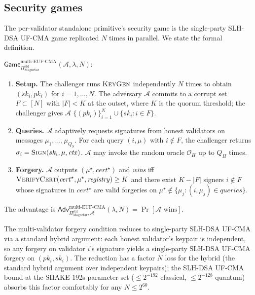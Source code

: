 \subsection{Security games}
\label{sec:prelim:games}

The per-validator standalone primitive's security game is the
single-party SLH-DSA UF-CMA game replicated $N$ times in parallel.
We state the formal definition.

\begin{definition}
\label{def:multivalidator-eufcma}
$\mathsf{Game}^{\mathrm{multi\text{-}EUF\text{-}CMA}}_{
\Pi^{\mathrm{std}}_{\mathrm{Magnetar}}}(\mathcal{A}, \lambda, N)$:
\begin{enumerate}[nosep,leftmargin=2em]
  \item \textbf{Setup.} The challenger runs $\textsc{KeyGen}$
        independently $N$ times to obtain $(sk_i, pk_i)$ for
        $i = 1, \ldots, N$. The adversary $\mathcal{A}$ commits
        to a corrupt set $F \subset [N]$ with $|F| < K$ at the
        outset, where $K$ is the quorum threshold; the
        challenger gives $\mathcal{A}$
        $\{(pk_i)\}_{i=1}^N \cup \{sk_i : i \in F\}$.
  \item \textbf{Queries.} $\mathcal{A}$ adaptively requests
        signatures from honest validators on messages $\mu_1,
        \ldots, \mu_{Q_S}$. For each query
        $(i, \mu)$ with $i \notin F$, the challenger returns
        $\sigma_i = \textsc{Sign}(sk_i, \mu, \mathit{ctx})$.
        $\mathcal{A}$ may invoke the random oracle $\mathcal{O}_H$
        up to $Q_H$ times.
  \item \textbf{Forgery.} $\mathcal{A}$ outputs $(\mu^\star,
        \mathit{cert}^\star)$ and \emph{wins} iff
        $\textsc{VerifyCert}(\mathit{cert}^\star, \mu^\star,
        \mathit{registry}) \ge K$ and there exist $K - |F|$
        signers $i \notin F$ whose signatures in $\mathit{cert}^\star$
        are valid forgeries on $\mu^\star \notin \{\mu_j : (i, \mu_j)
        \in \mathit{queries}\}$.
\end{enumerate}
The advantage is
$\mathsf{Adv}^{\mathrm{multi\text{-}EUF\text{-}CMA}}_{
\Pi^{\mathrm{std}}_{\mathrm{Magnetar}}, \mathcal{A}}(\lambda, N)
= \Pr[\mathcal{A} \text{ wins}]$.
\end{definition}

The multi-validator forgery condition reduces to single-party SLH-DSA
UF-CMA via a standard hybrid argument: each honest validator's
keypair is independent, so any forgery on validator $i$'s signature
yields a single-party SLH-DSA UF-CMA forgery on $(pk_i, sk_i)$. The
reduction has a factor $N$ loss for the hybrid (the standard hybrid
argument over independent keypairs); the SLH-DSA UF-CMA bound at the
SHAKE-192s parameter set ($\le 2^{-192}$ classical, $\le 2^{-128}$
quantum) absorbs this factor comfortably for any $N \le 2^{60}$.

